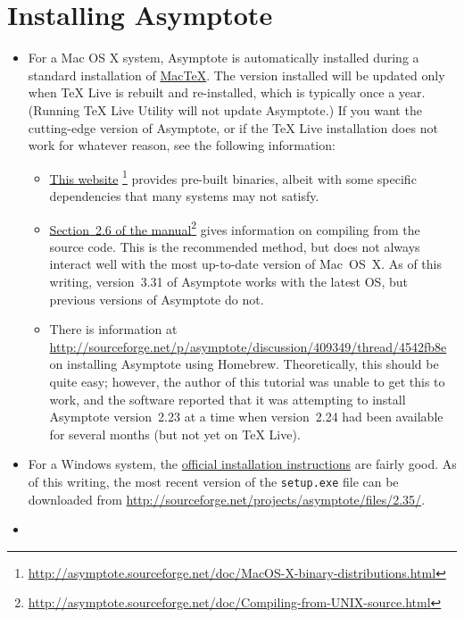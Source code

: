 \documentclass{article}
\begin{document}
\section{Installing Asymptote}\label{appendix:installing}
\begin{itemize}[wide]
 \item For a Mac OS X system, Asymptote is automatically installed
 during a standard installation 
 of \href{http://tug.org/mactex/}{MacTeX}. The version installed will be updated only when TeX Live is 
 rebuilt and re-installed, 
 which is typically once a year. (Running TeX Live Utility will not update 
 Asymptote.) If you want the cutting-edge version of Asymptote, or if the TeX Live installation 
 does not work for whatever reason,
see the following information:
\begin{itemize}
\item \href{http://asymptote.sourceforge.net/doc/MacOS-X-binary-distributions.html}{This website}%
\footnote{\url{http://asymptote.sourceforge.net/doc/MacOS-X-binary-distributions.html}} provides 
pre-built binaries, albeit with some specific dependencies that many systems may not satisfy.
\item \href{http://asymptote.sourceforge.net/doc/Compiling-from-UNIX-source.html}{Section~2.6 of the manual}\footnote{\url{http://asymptote.sourceforge.net/doc/Compiling-from-UNIX-source.html}} 
gives information 
on compiling from the source code. This is the recommended method, but does not always interact well 
with the most up-to-date version of Mac~OS~X.  As of this writing, version~3.31 of Asymptote works with 
the latest OS, but previous versions of Asymptote do not.
\item There is information at \url{http://sourceforge.net/p/asymptote/discussion/409349/thread/4542fb8e} 
on installing Asymptote using Homebrew.  Theoretically, this should be quite easy; however, the 
author of this tutorial was unable to get this to work, and the software reported that it 
was attempting to install Asymptote version~2.23 at a time when version~2.24 had been available for 
several months (but not yet on TeX Live).
\end{itemize}
 \item For a Windows system, the 
 \href{http://asymptote.sourceforge.net/doc/Microsoft-Windows.html}{official 
 installation instructions} are fairly good. As of this writing, the most 
 recent version of the \verb|setup.exe| file can be downloaded from 
 \url{http://sourceforge.net/projects/asymptote/files/2.35/}.
 \item

\end{itemize}
\end{document}
